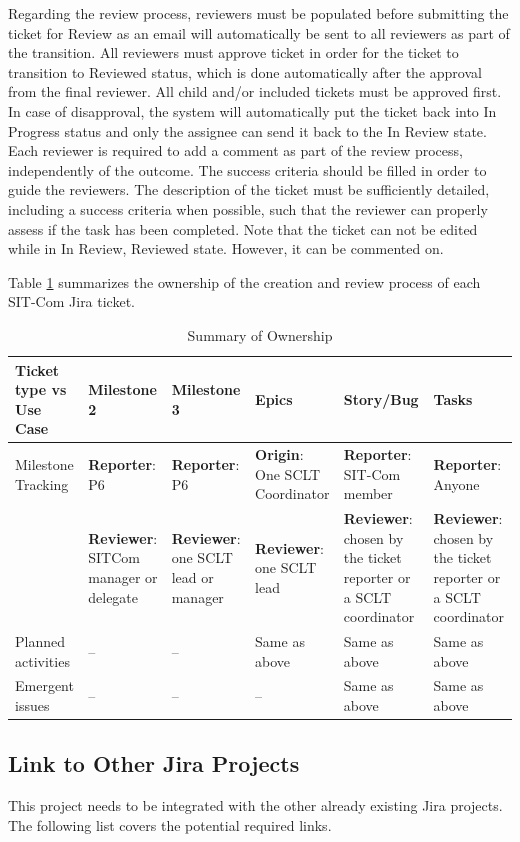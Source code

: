 \documentclass[SE,authoryear,toc]{lsstdoc}
\begin{document}
Regarding the review process, reviewers must be populated before submitting the ticket for Review as an email will automatically be sent to all reviewers as part of the transition. 
All reviewers must approve ticket in order for the ticket to transition to Reviewed status, which is done automatically after the approval from the final reviewer. 
All child and/or included tickets must be approved first. 
In case of disapproval, the system will automatically put the ticket back into In Progress status and only the assignee can send it back to the In Review state. 
Each reviewer is required to add a comment as part of the review process, independently of the outcome. 
The success criteria should be filled in order to guide the reviewers.
The description of the ticket must be sufficiently detailed, including a success criteria when possible, such that the reviewer can properly assess if the task has been completed.
Note that the ticket can not be edited while in In Review, Reviewed state. 
However, it can be commented on. 


Table \ref{tab:owner} summarizes the ownership of the creation and review process of each SIT-Com Jira ticket. 
\begin{table}
\begin{center}
\caption{\label{tab:owner} Summary of Ownership}
\begin{tabular}{|p{1.8cm}|p{1.8cm}|p{1.8cm}|p{1.8cm}|p{1.8cm}|p{1.8cm}}
\hline
Ticket type vs Use Case              & Milestone 2	& Milestone 3& Epics	& Story/Bug	& Tasks \\
\hline
\hline
Milestone Tracking & {\bf Reporter}: P6 &{\bf Reporter}: P6& {\bf Origin}: One SCLT Coordinator & {\bf Reporter}: SIT-Com member & {\bf Reporter}: Anyone \\
 & {\bf Reviewer}: SITCom manager or delegate & {\bf Reviewer}: one SCLT lead or manager & {\bf Reviewer}: one SCLT lead & {\bf Reviewer}: chosen by the ticket reporter or a SCLT coordinator & {\bf Reviewer}: chosen by the ticket reporter or a SCLT coordinator \\
\hline
Planned activities & -- & -- & Same as above & Same as above & Same as above \\
\hline
Emergent issues & -- & -- & -- & Same as above & Same as above \\
\hline
\end{tabular}
\end{center}
\end{table}

\subsection{Link to Other Jira Projects}
This project needs to be integrated with the other already existing Jira projects. 
The following list covers the potential required links.
\end{document}
